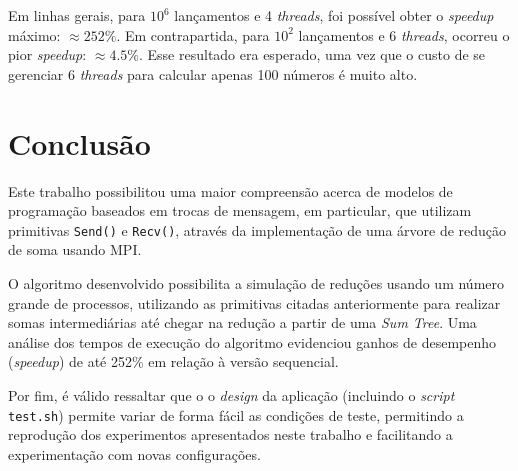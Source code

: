 \documentclass[12pt,a4paper]{article}
\begin{document}
Em linhas gerais, para $10^{6}$ lançamentos e 4 \textit{threads}, foi possível
obter o \textit{speedup} máximo: $\approx 252\%$. Em contrapartida, para
$10^{2}$ lançamentos e 6 \textit{threads}, ocorreu o pior \textit{speedup}:
$\approx 4.5\%$. Esse resultado era esperado, uma vez que o custo de se
gerenciar 6 \textit{threads} para calcular apenas 100 números é muito alto.



\section{Conclusão}
Este trabalho possibilitou uma maior compreensão acerca de modelos de
programação baseados em trocas de mensagem, em particular, que utilizam
primitivas \texttt{Send()} e \texttt{Recv()}, através da implementação de uma
árvore de redução de soma usando MPI\@.

O algoritmo desenvolvido possibilita a simulação de reduções usando um número
grande de processos, utilizando as primitivas citadas anteriormente para
realizar somas intermediárias até chegar na redução a partir de uma \emph{Sum
Tree}. Uma análise dos tempos de execução do algoritmo evidenciou ganhos de
desempenho (\textit{speedup}) de até 252\% em relação à versão sequencial.

Por fim, é válido ressaltar que o o \textit{design} da aplicação (incluindo o
\textit{script} \texttt{test.sh}) permite variar de forma fácil as condições de
teste, permitindo a reprodução dos experimentos apresentados neste trabalho e
facilitando a experimentação com novas configurações. 



\end{document}
